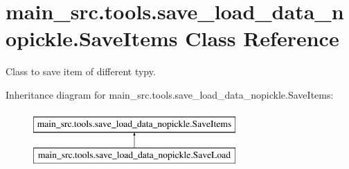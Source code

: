 \hypertarget{classmain__src_1_1tools_1_1save__load__data__nopickle_1_1SaveItems}{\section{main\-\_\-src.\-tools.\-save\-\_\-load\-\_\-data\-\_\-nopickle.\-Save\-Items Class Reference}
\label{classmain__src_1_1tools_1_1save__load__data__nopickle_1_1SaveItems}
}


Class to save item of different typy.  


Inheritance diagram for main\-\_\-src.\-tools.\-save\-\_\-load\-\_\-data\-\_\-nopickle.\-Save\-Items\-:\begin{figure}[H]
\begin{center}
\leavevmode
\includegraphics[height=2.000000cm]{classmain__src_1_1tools_1_1save__load__data__nopickle_1_1SaveItems}
\end{center}
\end{figure}
